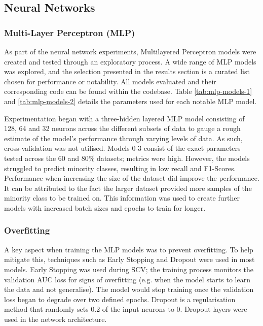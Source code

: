 \subsection{Neural Networks}
\label{sec: Neural Networks}

\subsubsection{Multi-Layer Perceptron (MLP)}
\label{sec: MLP Neural Network v1}

As part of the neural network experiments, Multilayered Perceptron models were created and tested through an exploratory process. A wide range of MLP models was explored, and the selection presented in the results section is a curated list chosen for performance or notability. All models evaluated and their corresponding code can be found within the codebase. Table \ref{tab:mlp-models-1} and \ref{tab:mlp-models-2} details the parameters used for each notable MLP model.  

Experimentation began with a three-hidden layered MLP model consisting of 128, 64 and 32 neurons across the different subsets of data to gauge a rough estimate of the model's performance through varying levels of data. As such, cross-validation was not utilised. Models 0-3 consist of the exact parameters tested across the 60 and 80\% datasets; metrics were high. However, the models struggled to predict minority classes, resulting in low recall and F1-Scores. Performance when increasing the size of the dataset did improve the performance. It can be attributed to the fact the larger dataset provided more samples of the minority class to be trained on. This information was used to create further models with increased batch sizes and epochs to train for longer.

\subsubsection*{Overfitting}

A key aspect when training the MLP models was to prevent overfitting. To help mitigate this, techniques such as Early Stopping and Dropout were used in most models. Early Stopping was used during SCV; the training process monitors the validation AUC loss for signs of overfitting (e.g. when the model starts to learn the data and not generalise). The model would stop training once the validation loss began to degrade over two defined epochs. Dropout is a regularisation method that randomly sets 0.2 of the input neurons to 0. Dropout layers were used in the network architecture.

